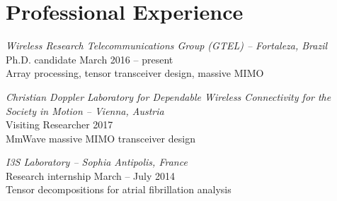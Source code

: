 \section{Professional Experience}

{\sl Wireless Research Telecommunications Group (GTEL) -- Fortaleza, Brazil}\\
Ph.D. candidate \hfill March 2016 -- present \\
Array processing, tensor transceiver design, massive MIMO

{\sl Christian Doppler Laboratory for Dependable Wireless Connectivity for the Society in Motion -- Vienna, Austria}\\
Visiting Researcher \hfill 2017 \\
MmWave massive MIMO transceiver design

{\sl I3S Laboratory -- Sophia Antipolis, France}\\
Research internship \hfill  March -- July 2014 \\
Tensor decompositions for atrial fibrillation analysis
